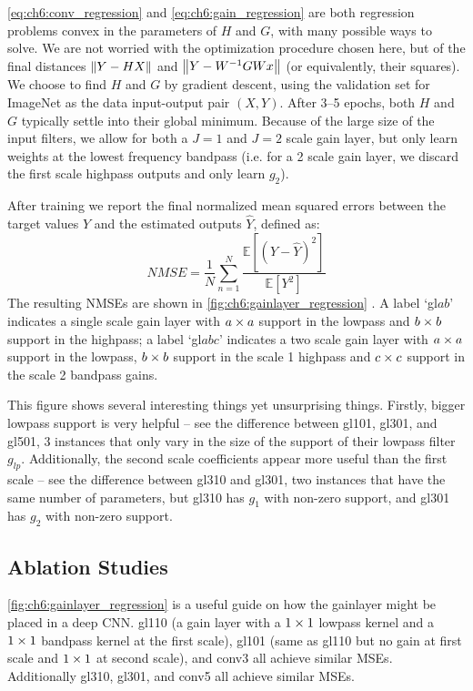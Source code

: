 \eqref{eq:ch6:conv_regression} and \eqref{eq:ch6:gain_regression} are both
regression problems convex in the parameters of $H$ and $G$, with many possible
ways to solve. We are not worried with the optimization procedure chosen here,
but of the final distances $\left\lVert Y-HX \right\rVert$ and $\left\lVert Y-W^{-1}GWx \right\rVert$ (or
equivalently, their squares). We choose to find $H$ and $G$ by gradient descent,
using the validation set for ImageNet as the data input-output pair $(X, Y)$.
After 3--5 epochs, both $H$ and $G$ typically settle into their global minimum.
Because of the large size of the input filters, we allow for both a $J=1$ and
$J=2$ scale gain layer, but only learn weights at the lowest frequency bandpass
(i.e. for a 2 scale gain layer, we discard the first scale highpass outputs and
only learn $g_2$). 

After training we report the final normalized mean squared errors between the
target values $Y$ and the estimated outputs $\hat{Y}$, defined as:
\begin{equation}
  NMSE = \frac{1}{N} \sum_{n=1}^N \frac{\mathbb{E}\left[(Y-\hat{Y})^2\right]}{\mathbb{E}\left[Y^2\right]}
\end{equation}
The resulting NMSEs are shown in \autoref{fig:ch6:gainlayer_regression} . A label
`gl$ab$' indicates a single scale gain layer with $a\times a$ support in the lowpass
and $b\times b$ support in the highpass; a label `gl$abc$' indicates a two scale
gain layer with $a\times a$ support in the lowpass, $b\times b$ support in the scale 1
highpass and $c\times c$ support in the scale 2 bandpass gains.

This figure shows several interesting things yet unsurprising things. Firstly,
bigger lowpass support is very helpful -- see the difference between gl101,
gl301, and gl501, 3 instances that only vary in the size of the support of their
lowpass filter $g_{lp}$. Additionally, the second scale coefficients appear more
useful than the first scale -- see the difference between gl310 and gl301, two
instances that have the same number of parameters, but gl310 has $g_1$ with
non-zero support, and gl301 has $g_2$ with non-zero support.

\subsection{Ablation Studies}\label{sec:ch6:ablation}
\autoref{fig:ch6:gainlayer_regression} is a useful guide on how the gainlayer
might be placed in a deep CNN. gl110 (a gain layer with a $1\times1$ lowpass kernel
and a $1\times1$ bandpass kernel at the first scale), gl101 (same as gl110 but no
gain at first scale and $1\times 1$ at second scale), and conv3 all achieve similar
MSEs. Additionally gl310, gl301, and conv5 all achieve similar MSEs. 

